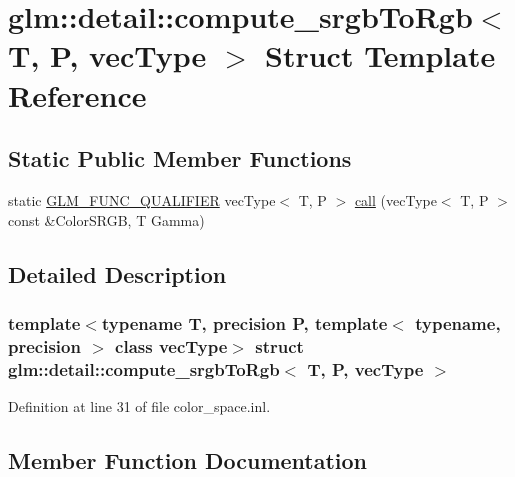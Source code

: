 \hypertarget{structglm_1_1detail_1_1compute__srgb_to_rgb}{}\section{glm\+::detail\+::compute\+\_\+srgb\+To\+Rgb$<$ T, P, vec\+Type $>$ Struct Template Reference}
\label{structglm_1_1detail_1_1compute__srgb_to_rgb}
\subsection*{Static Public Member Functions}
\begin{DoxyCompactItemize}
\item 
static \mbox{\hyperlink{setup_8hpp_a33fdea6f91c5f834105f7415e2a64407}{G\+L\+M\+\_\+\+F\+U\+N\+C\+\_\+\+Q\+U\+A\+L\+I\+F\+I\+ER}} vec\+Type$<$ T, P $>$ \mbox{\hyperlink{structglm_1_1detail_1_1compute__srgb_to_rgb_a73d176e6c80940ded57f4e76dc362f72}{call}} (vec\+Type$<$ T, P $>$ const \&Color\+S\+R\+GB, T Gamma)
\end{DoxyCompactItemize}


\subsection{Detailed Description}
\subsubsection*{template$<$typename T, precision P, template$<$ typename, precision $>$ class vec\+Type$>$\newline
struct glm\+::detail\+::compute\+\_\+srgb\+To\+Rgb$<$ T, P, vec\+Type $>$}



Definition at line 31 of file color\+\_\+space.\+inl.



\subsection{Member Function Documentation}
\mbox{\label{structglm_1_1detail_1_1compute__srgb_to_rgb_a73d176e6c80940ded57f4e76dc362f72}} 
